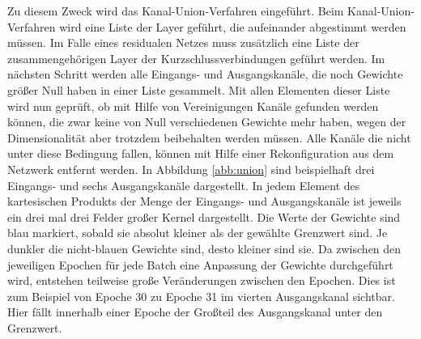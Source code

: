 Zu diesem Zweck wird das Kanal-Union-Verfahren eingeführt. Beim Kanal-Union-Verfahren wird eine Liste der Layer geführt, die aufeinander abgestimmt werden müssen. Im Falle eines residualen Netzes muss zusätzlich eine Liste der zusammengehörigen Layer der Kurzschlussverbindungen geführt werden. Im nächsten Schritt werden alle Eingangs- und Ausgangskanäle, die noch Gewichte größer Null haben in einer Liste gesammelt. Mit allen Elementen dieser Liste wird nun geprüft, ob mit Hilfe von Vereinigungen Kanäle gefunden werden können, die zwar keine von Null verschiedenen Gewichte mehr haben, wegen der Dimensionalität aber trotzdem beibehalten werden müssen. Alle Kanäle die nicht unter diese Bedingung fallen, können mit Hilfe einer Rekonfiguration aus dem Netzwerk entfernt werden. In Abbildung \ref{abb:union} sind beispielhaft drei Eingangs- und sechs Ausgangskanäle dargestellt. In jedem Element des kartesischen Produkts der Menge der Eingangs- und Ausgangskanäle ist jeweils ein drei mal drei Felder großer Kernel dargestellt. Die Werte der Gewichte sind blau markiert, sobald sie absolut kleiner als der gewählte Grenzwert sind. Je dunkler die nicht-blauen Gewichte sind, desto kleiner sind sie. Da zwischen den jeweiligen Epochen für jede Batch eine Anpassung der Gewichte durchgeführt wird, entstehen teilweise große Veränderungen zwischen den Epochen. Dies ist zum Beispiel von Epoche 30 zu Epoche 31 im vierten Ausgangskanal sichtbar. Hier fällt innerhalb einer Epoche der Großteil des Ausgangskanal unter den Grenzwert.
